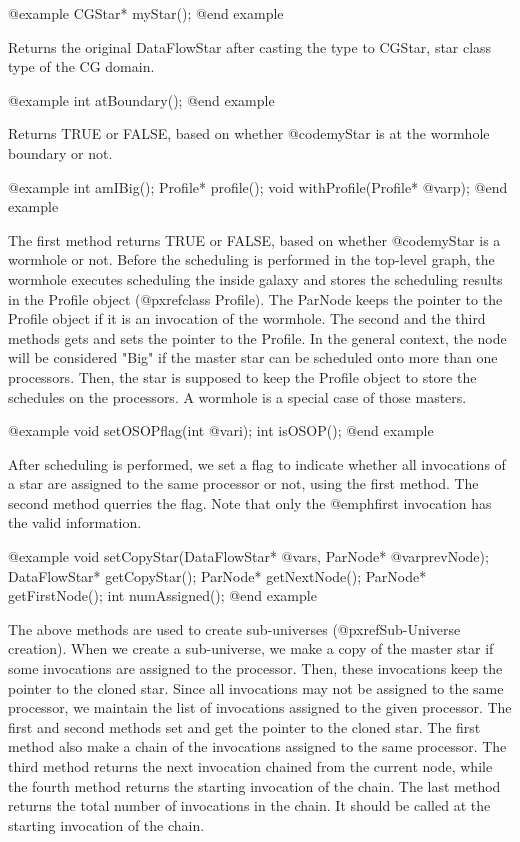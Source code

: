 @example
CGStar* myStar();
@end example

Returns the original DataFlowStar after casting the type to CGStar, star
class type of the CG domain.

@example
int atBoundary();
@end example

Returns TRUE or FALSE, based on whether @code{myStar} is at the wormhole
boundary or not.

@example
int amIBig();
Profile* profile();
void withProfile(Profile* @var{p});
@end example

The first method returns TRUE or FALSE, based on whether @code{myStar} is
a wormhole or not. 
Before the scheduling is performed in the top-level graph, the wormhole
executes scheduling the inside galaxy and stores the scheduling results
in the Profile object (@pxref{class Profile}). The ParNode keeps the pointer
to the Profile object if it is an invocation of the wormhole. The second
and the third methods gets and sets the pointer to the Profile. In the
general context, the node will be considered "Big" if the master star
can be scheduled onto more than one processors. Then, the star
is supposed to keep the Profile object to store the schedules on the
processors. A wormhole is a special case of those masters.

@example
void setOSOPflag(int @var{i});
int isOSOP();
@end example

After scheduling is performed, we set a flag to indicate whether all
invocations of a star are assigned to the same processor or not, using the
first method. The second method querries the flag. Note that only the
@emph{first} invocation has the valid information.

@example
void setCopyStar(DataFlowStar* @var{s}, ParNode* @var{prevNode});
DataFlowStar* getCopyStar();
ParNode* getNextNode();
ParNode* getFirstNode();
int numAssigned();
@end example

The above methods are used to create sub-universes 
(@pxref{Sub-Universe creation}). When we create a sub-universe, we make a
copy of the master star if some invocations are assigned to the processor.
Then, these invocations keep the pointer to the cloned star. Since
all invocations may not be assigned to the same processor, we maintain
the list of invocations assigned to the given processor. The first and
second methods set and get the pointer to the cloned star. The first method
also make a chain of the invocations assigned to the same processor.
The third method returns the next invocation chained from the current node,
while the fourth method returns the starting invocation of the chain. The
last method returns the total number of invocations in the chain. It should
be called at the starting invocation of the chain.

